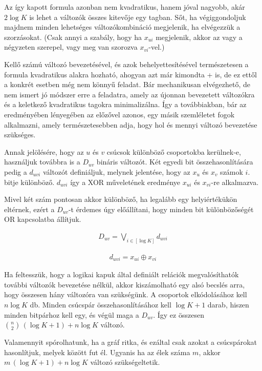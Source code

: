 Az így kapott formula azonban nem kvadratikus, hanem jóval nagyobb, akár $2 \log K$ is lehet a változók összes kitevője egy tagban. Sőt, ha végiggondoljuk majdnem minden lehetséges változókombináció megjelenik, ha elvégezzük a szorzásokat. (Csak annyi a szabály, hogy ha $x_{ui}$ megjelenik, akkor az vagy a négyzeten szerepel, vagy meg van szorozva $x_{vi}$-vel.)

Kellő számú változó bevezetésével, és azok behelyettesítésével természetesen a formula kvadratikus alakra hozható, ahogyan azt már kimondta \az+ is, de ez ettől a konkrét esetben még nem könnyű feladat. Bár mechanikusan elvégezhető, de nem ismert jó módszer erre a feladatra, amely az újonnan bevezetett változókra és a keletkező kvadratikus tagokra minimalizálna. Így a továbbiakban, bár az eredményében lényegében az előzővel azonos, egy másik szemléletet fogok alkalmazni, amely természetesebben adja, hogy hol és mennyi változó bevezetése szükséges.

Annak jelölésére, hogy az $u$ és $v$ csúcsok különböző csoportokba kerülnek-e, használjuk továbbra is a $D_{uv}$ bináris változót. Két egyedi bit összehasonlítására pedig a $d_{uvi}$ változót definiáljuk, melynek jelentése, hogy az $x_u$ és $x_v$ számok $i.$ bitje különböző. $d_{uvi}$ így a XOR műveletének eredménye $x_{ui}$ és  $x_{vi}$-re alkalmazva.

Mivel két szám pontosan akkor különböző, ha legalább egy helyiértékükön eltérnek, ezért a $D_{uv}$-t érdemes úgy előállítani, hogy minden bit különbözőségét OR kapcsolatba állítjuk.

\begin{align}
	D_{uv} = \bigvee_{i \in [ \log K ] }{d_{uvi}}
\end{align}

\begin{align}
	d_{uvi} = x_{ui} \oplus x_{vi}
\end{align}

Ha feltesszük, hogy a logikai kapuk által definiált relációk megvalósíthatók további változók bevezetése nélkül, akkor kiszámolható egy alsó becslés arra, hogy összesen hány változóra van szükségünk. A csoportok elkódolásához kell $n \log K$ db. Minden csúcspár összehasonlításához kell $\log K + 1$ darab, hiszen minden bitpárhoz kell egy, és végül maga a $D_{uv}$. Így ez összesen $\binom{n}{2} \, ( \log K + 1 ) + n\log K$ változó.

Valamennyit spórolhatunk, ha a gráf ritka, és ezáltal csak azokat a csúcspárokat hasonlítjuk, melyek között fut él. Ugyanis ha az élek száma $m$, akkor $m \, ( \log K + 1 ) + n\log K$ változó szükségeltetik.

